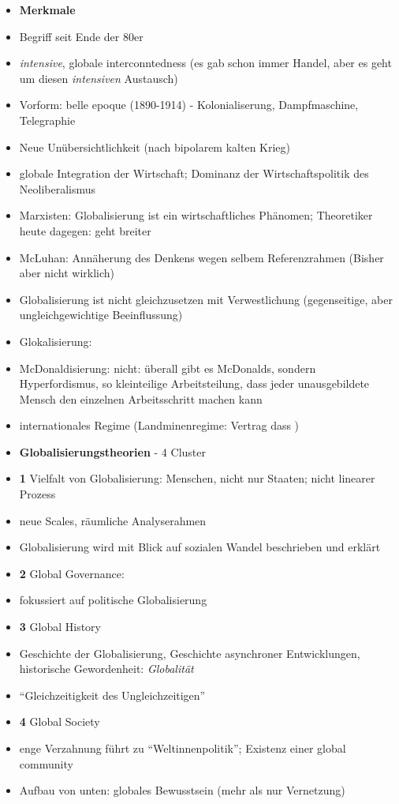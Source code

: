 \documentclass[emulatestandardclasses]{scrartcl}
\begin{document}
\begin{itemize}
  \item \textbf{Merkmale}
  \item Begriff seit Ende der 80er 
  \item \emph{intensive}, globale interconntedness (es gab schon immer Handel, aber es geht um diesen \emph{intensiven} Austausch)
  \item Vorform: belle epoque (1890-1914) - Kolonialiserung, Dampfmaschine, Telegraphie
  \item Neue Unübersichtlichkeit (nach bipolarem kalten Krieg)
  \item globale Integration der Wirtschaft; Dominanz der Wirtschaftspolitik des Neoliberalismus
  \item Marxisten: Globalisierung ist ein wirtschaftliches Phänomen; Theoretiker heute dagegen: geht breiter
  \item McLuhan: Annäherung des Denkens wegen selbem Referenzrahmen (Bisher aber nicht wirklich)
  \item Globalisierung ist nicht gleichzusetzen mit Verwestlichung (gegenseitige, aber ungleichgewichtige Beeinflussung)
  \item Glokalisierung:
  \item McDonaldisierung: nicht: überall gibt es McDonalds, sondern Hyperfordismus, so kleinteilige Arbeitsteilung, dass jeder unausgebildete Mensch den einzelnen Arbeitsschritt machen kann
  \item internationales Regime (Landminenregime: Vertrag dass )
  \item \textbf{Globalisierungstheorien} - 4 Cluster
  \item \textbf{1} Vielfalt von Globalisierung: Menschen, nicht nur Staaten; nicht linearer Prozess
  \item neue Scales, räumliche Analyserahmen
  \item Globalisierung wird mit Blick auf sozialen Wandel beschrieben und erklärt
  \item \textbf{2} Global Governance: 
  \item fokussiert auf politische Globalisierung
  \item \textbf{3} Global History
  \item Geschichte der Globalisierung, Geschichte asynchroner Entwicklungen, historische Gewordenheit: \emph{Globalität}
  \item "`Gleichzeitigkeit des Ungleichzeitigen"'
  \item \textbf{4} Global Society
  \item enge Verzahnung führt zu "`Weltinnenpolitik"'; Existenz einer global community
  \item Aufbau von unten: globales Bewusstsein (mehr als nur Vernetzung)
\end{itemize}
\end{document}
